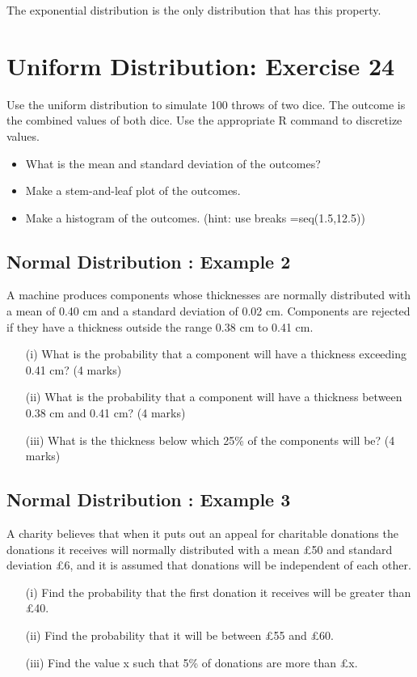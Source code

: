 \documentclass[12pt]{report}
\begin{document}
{{The exponential distribution is the only distribution that has this property.
}

\section*{Uniform Distribution: Exercise 24}

Use the uniform distribution to simulate 100 throws of two dice. The outcome is the combined values of both dice. Use the appropriate R command to discretize values.
\begin{itemize}
	\item  What is the mean and standard deviation of the outcomes?
	\item  Make a stem-and-leaf plot of the outcomes.
	\item Make a histogram of the outcomes. (hint: use breaks =seq(1.5,12.5))
\end{itemize}



\subsection{Normal Distribution : Example 2}
A machine produces components whose thicknesses are normally
distributed with a mean of 0.40 cm and a standard deviation of 0.02 cm.
Components are rejected if they have a thickness outside the range 0.38 cm
to 0.41 cm.
\begin{itemize}
\item[(i)] What is the probability that a component will have a thickness
exceeding 0.41 cm? (4 marks)
\item[(ii)] What is the probability that a component will have a thickness between
0.38 cm and 0.41 cm? (4 marks)
\item[(iii)] What is the thickness below which 25\% of the components will be? (4 marks)
\end{itemize}
\subsection{Normal Distribution : Example 3}
A charity believes that when it puts out an appeal for charitable donations the
donations it receives will normally distributed with a mean £50 and standard
deviation £6, and it is assumed that donations will be independent of each
other.
\begin{itemize}
	\item[(i)] Find the probability that the first donation it receives will be greater
	than £40.
	\item[(ii)] Find the probability that it will be between £55 and £60.
	\item[(iii)] Find the value x such that 5\% of donations are more than £x.
\end{itemize}






}
\end{document}

